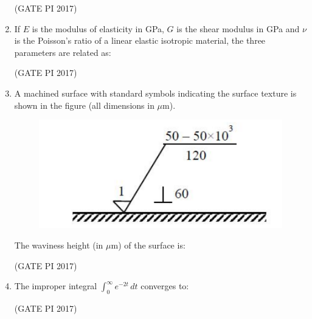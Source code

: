 \documentclass[journal,12pt,onecolumn]{IEEEtran}
\theoremstyle{remark}
\begin{document}
\begin{enumerate}
\hfill (GATE PI 2017)

\item If $E$ is the modulus of elasticity in GPa, $G$ is the shear modulus in GPa and $\nu$ is the Poisson's ratio of a linear elastic isotropic material, the three parameters are related as:
\begin{enumerate}
\end{enumerate}

\hfill (GATE PI 2017)

\item A machined surface with standard symbols indicating the surface texture is shown in the figure (all dimensions in $\mu$m).  

\begin{figure}[h]
    \centering
    \includegraphics[width=0.5\linewidth]{fig3.png}
    \caption{}
    \label{fig:placeholder}
\end{figure}

The waviness height (in $\mu$m) of the surface is:
\begin{enumerate}
\end{enumerate}

\hfill (GATE PI 2017)

\item The improper integral $\int_{0}^{\infty} e^{-2t} \, dt$ converges to:
\begin{enumerate}
\end{enumerate}
\hfill (GATE PI 2017)


\end{enumerate}
\end{document}
